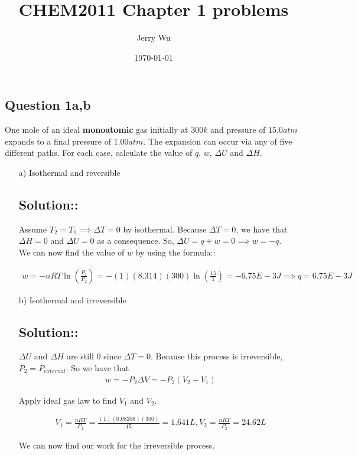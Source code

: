 \documentclass[12pt]{article}
\title{CHEM2011 Chapter 1 problems}
\date{\today}
\author{Jerry Wu}
\begin{document}
\maketitle

\subsection*{Question 1a,b}

One mole of an ideal \textbf{monoatomic} gas initially at $300k$ and pressure of $15.0atm$ expands to a final pressure of $1.00 atm$. The expansion can occur via any of five different paths. For each case, calculate the value of $q$, $w$, $\Delta U$ and $\Delta H$.

\begin{itemize}
    \item[a)] Isothermal and reversible
    \subsection*{Solution::}
    Assume $T_2=T_1\implies \Delta T=0$ by isothermal. Because $\Delta T=0$, we have that $\Delta H=0$ and $\Delta U=0$ as a consequence. So, $\Delta U=q+w=0\implies w=-q$.\\
    We can now find the value of $w$ by using the formula::

    \begin{align*}
        w=-nRT\ln(\frac{P_1}{P_2})=-(1)(8.314)(300)\ln(\frac{15}{1})=-6.75E-3 J\implies q=6.75E-3J
    \end{align*}

    \item[b)] Isothermal and irreversible
    \subsection*{Solution::}
    $\Delta U$ and $\Delta H$ are still 0 since $\Delta T=0$. Because this process is irreversible, $P_2=P_{external}$. So we have that
    \begin{align*}
        w=-P_2\Delta V=-P_2(V_2-V_1)
    \end{align*}

    Apply ideal gas law to find $V_1$ and $V_2$.

    \begin{align*}
        V_1=\frac{nRT}{P_1}=\frac{(1)(0.08206)(300)}{15}=1.641L, V_2=\frac{nRT}{P_2}=24.62L
    \end{align*}

    We can now find our work for the irreversible process.


\end{itemize}
\end{document}

